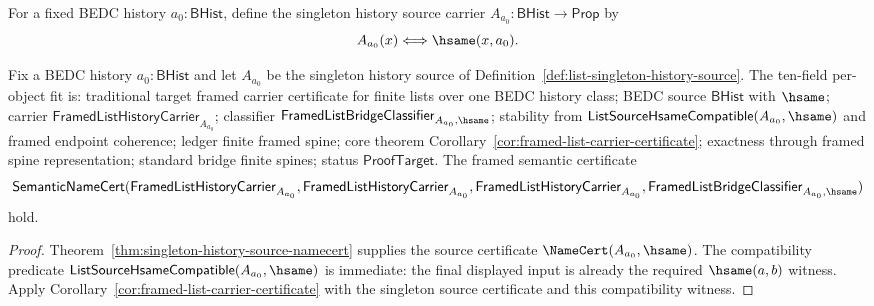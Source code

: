 \begin{definition}
\label{def:list-singleton-history-source}
For a fixed BEDC history $a_0:\mathsf{BHist}$, define the singleton history
source carrier $A_{a_0}:\mathsf{BHist}\to\mathsf{Prop}$ by
$$
A_{a_0}(x)\Longleftrightarrow\hsame(x,a_0).
$$
\end{definition}

\begin{theorem}
\label{thm:list-singleton-source-framed-carrier-certificate}
Fix a BEDC history $a_0:\mathsf{BHist}$ and let $A_{a_0}$ be the singleton
history source of Definition~\ref{def:list-singleton-history-source}. The
ten-field per-object fit is: traditional target framed carrier certificate for
finite lists over one BEDC history class; BEDC source $\mathsf{BHist}$ with
$\hsame$; carrier
$\mathsf{FramedListHistoryCarrier}_{A_{a_0}}$; classifier
$\mathsf{FramedListBridgeClassifier}_{A_{a_0},\hsame}$; stability from
$\mathsf{ListSourceHsameCompatible}(A_{a_0},\hsame)$ and framed endpoint
coherence; ledger finite framed spine; core theorem
Corollary~\ref{cor:framed-list-carrier-certificate}; exactness
through framed spine representation; standard bridge finite spines; status
$\mathsf{ProofTarget}$. The framed semantic certificate
$$
\mathsf{SemanticNameCert}(\mathsf{FramedListHistoryCarrier}_{A_{a_0}},
\mathsf{FramedListHistoryCarrier}_{A_{a_0}},
\mathsf{FramedListHistoryCarrier}_{A_{a_0}},
\mathsf{FramedListBridgeClassifier}_{A_{a_0},\hsame})
$$
hold.
\end{theorem}
\begin{proof}
Theorem~\ref{thm:singleton-history-source-namecert} supplies the source
certificate $\NameCert(A_{a_0},\hsame)$. The compatibility predicate
$\mathsf{ListSourceHsameCompatible}(A_{a_0},\hsame)$ is immediate: the final displayed input is already the required $\hsame(a,b)$ witness. Apply
Corollary~\ref{cor:framed-list-carrier-certificate} with the singleton source
certificate and this compatibility witness.
\end{proof}

